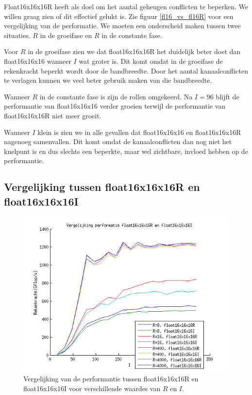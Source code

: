 Float16x16x16R heeft als doel om het aantal geheugen conflicten te beperken. We willen graag zien of dit effectief gelukt is. Zie figuur \ref{fl16_vs_fl16R} voor een vergelijking van de performatie. We moeten een onderscheid maken tussen twee situaties. $R$ in de groeifase en $R$ in de constante fase.

Voor $R$ in de groeifase zien we dat float16x16x16R het duidelijk beter doet dan float16x16x16 wanneer $I$ wat groter is. Dit komt omdat in de groeifase de rekenkracht beperkt wordt door de bandbreedte. Door het aantal kanaalconflicten te verlagen kunnen we veel beter gebruik maken van die bandbreedte.

Wanneer $R$ in de constante fase is zijn de rollen omgekeerd. Na $I=96$ blijft de performantie van float16x16x16 verder groeien terwijl de performantie van float16x16x16R niet meer groeit.

Wanneer $I$ klein is zien we in alle gevallen dat float16x16x16 en float16x16x16R nagenoeg samenvallen. Dit komt omdat de kanaalconflicten dan nog niet het knelpunt is en dus slechts een beperkte, maar wel zichtbare, invloed hebben op de performantie.



\subsection{Vergelijking tussen float16x16x16R en float16x16x16I}
\begin{figure}[h!]
\centering
\includegraphics{fl16R_vs_fl16I}
\caption{\label{fl16R_vs_fl16I} Vergelijking van de performantie tussen float16x16x16R en float16x16x16I voor verschillende waardes van $R$ en $I$.}
\end{figure}

